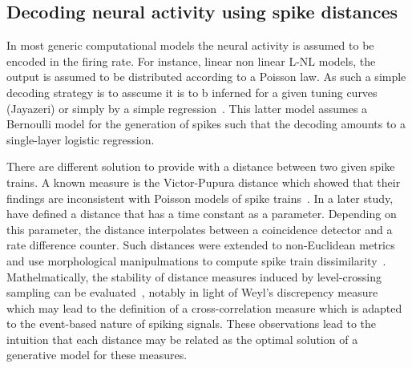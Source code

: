 \documentclass[brainsci, %
               review,submit,pdftex,moreauthors%
               ]{Definitions/mdpi}
\begin{document}
\subsection{Decoding neural activity using spike distances}
In most generic computational models the neural activity is assumed to be encoded in the firing rate. For instance, linear non linear L-NL models, the output is assumed to be distributed according to a Poisson law. As such a simple decoding strategy is to asscume it is to b inferned for a given tuning curves (Jayazeri) or simply by a simple regression~\citep{berens_fast_2012}. This latter model assumes a Bernoulli model for the generation of spikes such that the decoding amounts to a single-layer logistic regression.

There are different solution to provide with a distance between two given spike trains. A known measure is the Victor-Pupura distance which showed that their findings are inconsistent with Poisson models of spike trains~\citep{victor_nature_1996}. In a later study,~\citet{van_rossum_novel_2001} have defined a distance that has a time constant as a parameter. Depending on this parameter, the distance interpolates between a coincidence detector and a rate difference counter. Such distances were extended to non-Euclidean metrics~\citep{} and use morphological manipulmations to compute spike train dissimilarity~\citet{kruz}. Mathelmatically, the stability of distance measures induced by level-crossing sampling can be evaluated~\citep{moser_stability_2014}, notably in light of Weyl's discrepency measure~\citep{weyl_ber_1916} which may lead to the definition of a cross-correlation measure which is adapted to the event-based nature of spiking signals. These observations lead to the intuition that each distance may be related as the optimal solution of a generative model for these measures.
\end{document}
